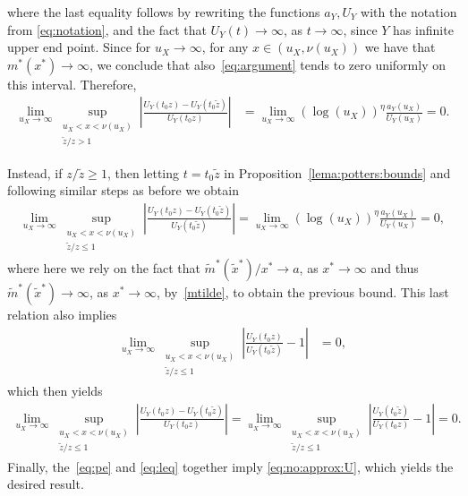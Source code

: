 \documentclass{statsoc}
\theoremstyle{break}
\newcommand{\tzero}{t_0}
\newcommand{\beao}{\begin{eqnarray*}}
\newcommand{\eeao}{\end{eqnarray*}\noindent}
\begin{document}
where the last equality follows by rewriting the functions $a_Y, U_Y$ with the notation from \eqref{eq:notation}, and the fact that $U_Y(t)
\to \infty$, as $t \to \infty$, since $Y$ has infinite upper end point. 
Since for $u_X\to\infty$, for any $x\in(u_X, \nu(u_X))$ we have that $m^*(x^*) \to\infty$, we conclude that also~\eqref{eq:argument} tends to zero uniformly on this interval. Therefore,
\begin{align}\label{eq:pe}
	\lim_{u_X \to \infty} \sup_{  \substack{ u_{X} < x  < \nu(u_X) \\
			\tilde z/z > 1
	} }   \left|  \frac{U_Y(\tzero z) - U_Y(\tzero \tilde z)}{ U_Y(\tzero z)} \right|  
	&= \lim_{u_X \to \infty}  ( \log(u_{X}) )^\eta \frac{a_Y( u_{X} )}{ U_Y( u_{X} )	} = 0.
\end{align}





Instead, if $z/\tilde z \geq 1 $, then letting $t = t_0  \tilde z$ in Proposition~\ref{lema:potters:bounds} and following similar steps as before we obtain
\beao 
\lim_{u_X \to \infty} \sup_{\substack{ u_{X} < x  < \nu(u_X) \\
		\tilde z/ z \leq  1
} } \left|  \frac{U_Y(\tzero z) - U_Y(\tzero \tilde z)}{ U_Y(\tzero  \tilde z)} \right| 
= \lim_{u_X \to \infty} (\log(u_X))^\eta \frac{a_Y(u_X)}{U_Y(u_X)} = 0,
\eeao 
where here we rely on the fact that $\tilde m^*(\tilde x^*)/x^* \to a$, as $x^* \to \infty$ and thus $\tilde m^*( \tilde x^*) \to \infty$, as $x^* \to \infty$, by~\eqref{mtilde}, to obtain the previous bound. 
This last relation also implies 
\begin{align}\label{eq:correct:renorm}
	\lim_{u_X \to \infty} \sup_{  \substack{ u_{X} < x  < \nu(u_X) \\
			\tilde z/z \leq 1
	} }    \left| \frac{U_Y(\tzero  z)}{ U_Y(\tzero \tilde z)}  - 1\right| 
	&= 0 ,
\end{align}
which then yields 
\begin{align}\label{eq:leq}
	\lim_{u_X \to \infty}\sup_{\substack{ u_{X} < x  < \nu(u_X) \\
			\tilde z/ z \leq  1
	} } \left|  \frac{U_Y(\tzero z) - U_Y(\tzero \tilde z)}{ U_Y(\tzero   z)} \right| = \lim_{u_X \to \infty} \sup_{  \substack{ u_{X} < x  < \nu(u_X) \\
	\tilde z/z \leq 1
} }    \left| \frac{U_Y(\tzero  \tilde z)}{ U_Y(\tzero z)}  - 1\right| =  0. \end{align} 
Finally, the~\eqref{eq:pe} and \eqref{eq:leq} together  imply \eqref{eq:no:approx:U}, which yields the desired result. 
\end{document}
